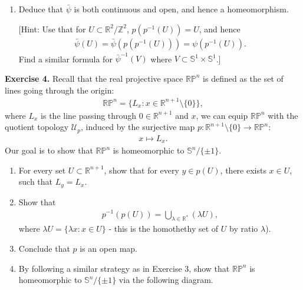\documentclass[12pt]{article}
\begin{document}
\begin{enumerate}
\item[(vi)] Deduce that $\bar{\psi}$ is both continuous and open, and hence a homeomorphism.

[Hint: Use that for $U \subset \mathbb{R}^2/\mathbb{Z}^2$, $p(p^{-1}(U)) = U$, and hence
\begin{align*}
\bar{\psi}(U)
= \bar{\psi}\left(p\left(p^{-1}(U)\right)\right)
= \psi\left(p^{-1}(U)\right).
\end{align*}
Find a similar formula for $\bar{\psi}^{-1}(V)$ where $V \subset \mathbb{S}^1 \times \mathbb{S}^1$.]
\end{enumerate}

\clearpage

\noindent\textbf{Exercise 4.}
Recall that the real projective space $\mathbb{RP}^n$ is defined as the set of lines going through the origin:
\begin{align*}
\mathbb{RP}^n = \{L_x : x \in \mathbb{R}^{n+1} \setminus \{0\}\},
\end{align*}
where $L_x$ is the line passing through $0 \in \mathbb{R}^{n+1}$ and $x$, we can equip $\mathbb{RP}^n$ with the quotient topology $\mathcal{U}_p$, induced by the surjective map $p : \mathbb{R}^{n+1} \setminus \{0\} \to \mathbb{RP}^n$:
\begin{align*}
x \mapsto L_x.
\end{align*}
Our goal is to show that $\mathbb{RP}^n$ is homeomorphic to $\mathbb{S}^n/\{\pm 1\}$.
\begin{enumerate}
\item[(i)] For every set $U \subset \mathbb{R}^{n+1}$, show that for every $y \in p(U)$, there exists $x \in U$, such that $L_y = L_x$.
\item[(ii)] Show that
\begin{align*}
p^{-1}(p(U)) = \bigcup_{\lambda \in \mathbb{R}^*}(\lambda U),
\end{align*}
where $\lambda U = \{\lambda x : x \in U\}$ - this is the homothethy set of $U$ by ratio $\lambda$).
\item[(iii)] Conclude that $p$ is an open map.
\item[(iv)] By following a similar strategy as in Exercise 3, show that $\mathbb{RP}^n$ is homeomorphic to $\mathbb{S}^n/\{\pm 1\}$ via the following diagram.
\begin{center}
\end{center}
\end{enumerate}
\end{document}
